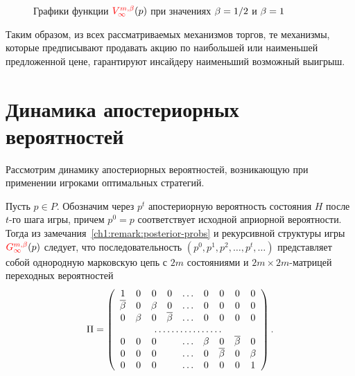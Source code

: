 {\begin{figure}[b]
  \centering
  \caption{Графики функции $\V*{\infty}(p)$ при значениях $\beta = 1/2$ и $\beta = 1$}
  \label{ch1:fig:value-comparison}
\end{figure}

Таким образом, из всех рассматриваемых механизмов торгов, те механизмы, которые предписывают продавать акцию по наибольшей или наименьшей предложенной цене, гарантируют инсайдеру наименьший возможный выигрыш.

\section{Динамика апостериорных вероятностей}
Рассмотрим динамику апостериорных вероятностей, возникающую при применении игроками оптимальных стратегий.

Пусть $p \in P$. Обозначим через $p^t$ апостериорную вероятность состояния $H$ после $t$-го шага игры, причем $p^0 = p$ соответствует исходной априорной вероятности.
Тогда из замечания~\ref{ch1:remark:posterior-probs} и рекурсивной структуры игры $\theG*{\infty}(p)$ следует, что последовательность $(p^0, p^1, p^2, \ldots, p^t, \ldots)$ представляет собой однородную марковскую цепь с $2m$ состояниями и $2m \times 2m$-матрицей переходных вероятностей
\begin{equation}
  \label{ch1:eq:posterior-chain}
  \Pi = 
  \left(
    \begin{array}{ccccccccc}
      1    & 0   & 0   & 0    & \ldots & 0   & 0    & 0    & 0   \\
      \DCo & 0   & \Co & 0    & \ldots & 0   & 0    & 0    & 0   \\
      0    & \Co & 0   & \DCo & \ldots & 0   & 0    & 0    & 0   \\
      \hdotsfor{9}                                               \\
      0    & 0   & 0   &      & \ldots & \Co & 0    & \DCo & 0   \\
      0    & 0   & 0   &      & \ldots & 0   & \DCo & 0    & \Co \\
      0    & 0   & 0   &      & \ldots & 0   & 0    & 0    & 1
    \end{array}
 \right).
\end{equation}

}
